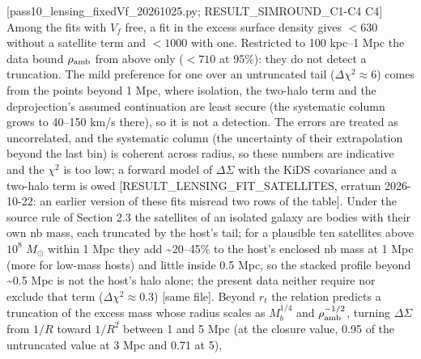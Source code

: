 \documentclass[
  10pt,
]{article}
\begin{document}
{[}pass10\_lensing\_fixedVf\_20261025.py; RESULT\_SIMROUND\_C1-C4 C4{]} Among the fits with $V_f$ free, a fit in the excess surface density gives $<630$ without a satellite term and $<1000$ with one. Restricted to 100 kpc--1 Mpc the data bound $\rho_{\rm amb}$ from above only ($<710$ at 95\%): they do not detect a truncation. The mild preference for one over an untruncated tail ($\Delta\chi^2\approx6$) comes from the points beyond 1 Mpc, where isolation, the two-halo term and the deprojection's assumed continuation are least secure (the systematic column grows to 40--150 km/s there), so it is not a detection. The errors are treated as uncorrelated, and the systematic column (the uncertainty of their extrapolation beyond the last bin) is coherent across radius, so these numbers are indicative and the $\chi^2$ is too low; a forward model of $\Delta\Sigma$ with the KiDS covariance and a two-halo term is owed {[}RESULT\_LENSING\_FIT\_SATELLITES, erratum 2026-10-22: an earlier version of these fits misread two rows of the table{]}. Under the source rule of Section 2.3 the satellites of an isolated galaxy are bodies with their own nb mass, each truncated by the host's tail; for a plausible ten satellites above $10^{8}$ $M_\odot$ within 1 Mpc they add \textasciitilde{}20--45\% to the host's enclosed nb mass at 1 Mpc (more for low-mass hosts) and little inside 0.5 Mpc, so the stacked profile beyond \textasciitilde{}0.5 Mpc is not the host's halo alone; the present data neither require nor exclude that term ($\Delta\chi^2\approx0.3$) {[}same file{]}. Beyond $r_t$ the relation predicts a truncation of the excess mass
whose radius scales as $M_b^{1/4}$ and $\rho_{\rm amb}^{-1/2}$, turning
$\Delta\Sigma$ from $1/R$ toward $1/R^2$ between 1 and 5 Mpc (at the closure
value, 0.95 of the untruncated value at 3 Mpc and 0.71 at 5),
\end{document}
